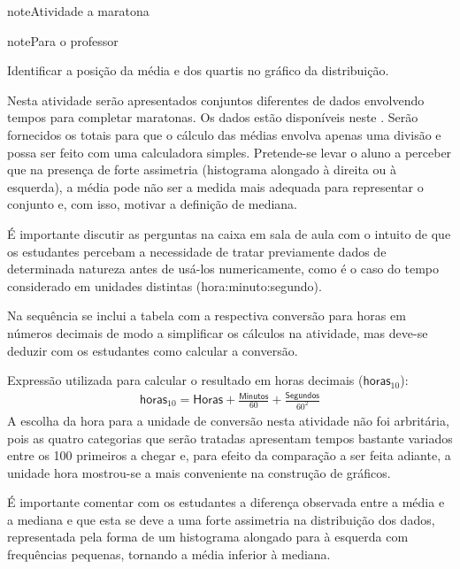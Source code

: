 \label{\detokenize{PE104-0:ativ-maratona-de-ny}}
\begin{sphinxadmonition}{note}{Atividade}{ a maratona}

\begin{sphinxadmonition}{note}{Para o professor}

 Identificar a posição da média e dos quartis no gráfico da distribuição.

 Nesta atividade serão apresentados conjuntos diferentes de dados envolvendo tempos para completar maratonas. Os dados estão disponíveis neste . Serão fornecidos os totais para que o cálculo das médias envolva apenas uma divisão e possa ser feito com uma calculadora simples. Pretende-se levar o aluno a perceber que na presença de forte assimetria (histograma alongado à direita ou à esquerda), a média pode não ser a medida mais adequada para representar o conjunto e, com isso, motivar a definição de mediana.

É importante discutir as perguntas na caixa  em sala de aula com o intuito de que os estudantes percebam a necessidade de tratar previamente dados de determinada natureza antes de usá-los numericamente, como é o caso do tempo considerado em unidades distintas (hora:minuto:segundo).

Na sequência se inclui a tabela com a respectiva conversão para horas em números decimais de modo a simplificar os cálculos na atividade, mas deve-se deduzir com os estudantes como calcular a conversão.

Expressão utilizada para calcular o resultado em horas decimais (\(\textsf{horas}_{10}\)):
\begin{equation*}
\begin{split}\textsf{horas}_{10} = \textsf{Horas} + \frac{\textsf{Minutos}}{60} + \frac{\textsf{Segundos}}{60^2}\end{split}
\end{equation*}
A escolha da hora para a unidade de conversão nesta atividade não foi arbritária, pois as quatro categorias que serão tratadas apresentam tempos bastante variados entre os 100 primeiros a chegar e, para efeito da comparação a ser feita adiante, a unidade hora mostrou-se a mais conveniente na construção de gráficos.

É importante comentar com os estudantes a diferença observada entre a média e a mediana e que esta se deve a uma forte assimetria na distribuição dos dados, representada pela forma de um histograma alongado para à esquerda com frequências pequenas, tornando a média inferior à mediana.


\end{sphinxadmonition}
\end{sphinxadmonition}
